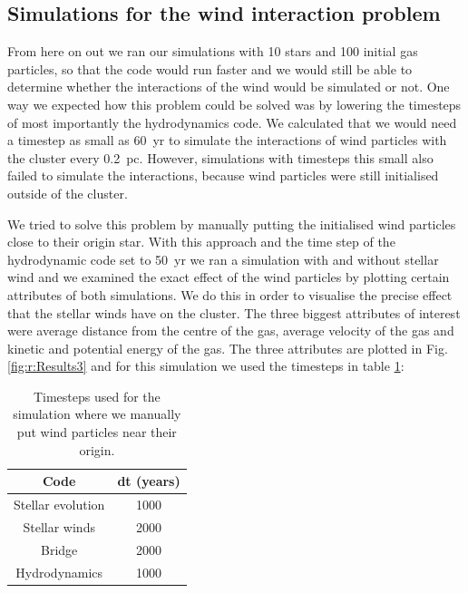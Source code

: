 \documentclass[12pt, twocolumn]{article}
\begin{document}
\subsection{Simulations for the wind interaction problem}
From here on out we ran our simulations with 10 stars and 100 initial gas particles, so that the code would run faster and we would still be able to determine whether the interactions of the wind would be simulated or not.
One way we expected how this problem could be solved was by lowering the timesteps of most importantly the hydrodynamics code.
We calculated that we would need a timestep as small as \SI{60}{yr} to simulate the interactions of wind particles with the cluster every \SI{0.2}{pc}.
However, simulations with timesteps this small also failed to simulate the interactions, because wind particles were still initialised outside of the cluster. 


We tried to solve this problem by manually putting the initialised wind particles close to their origin star.
With this approach and the time step of the hydrodynamic code set to \SI{50}{yr} we ran a simulation with and without stellar wind and we examined the exact effect of the wind particles by plotting certain attributes of both simulations. We do this in order to visualise the precise effect that the stellar winds have on the cluster.
The three biggest attributes of interest were average distance from the centre of the gas, average velocity of the gas and kinetic and potential energy of the gas. The three attributes are plotted in Fig. \ref{fig:r:Results3} and for this simulation we used the timesteps in table \ref{tab:timesteps3}:
\begin{table}[]
    \centering
    \begin{tabular}{c|c}
         Code & dt (years) \\
         \hline
         Stellar evolution & 1000 \\
         Stellar winds & 2000 \\
         Bridge & 2000 \\
         Hydrodynamics & 1000 \\
    \end{tabular}
    \caption{Timesteps used for the simulation where we manually put wind particles near their origin.}
    \label{tab:timesteps3}
\end{table}

\end{document}
